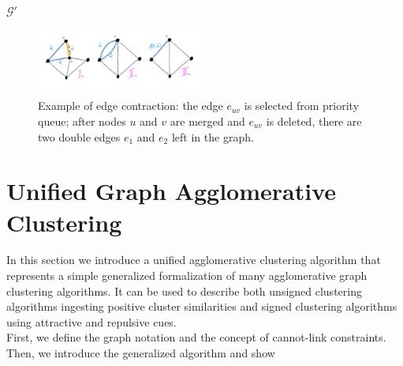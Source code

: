 \begin{algorithm}
\begin{algorithmic}[1]
      \State
      \State
      \Return $\mathcal{G}'$



  \end{algorithmic}
  \label{main_alg}
\end{algorithm}

\begin{figure}
\centering
\includegraphics[width=0.50\textwidth,trim=0.in 0.in 0.in 0.in,clip]{./figs/edge_contraction.png}
\caption{\small 
Example of edge contraction: the edge $e_{uv}$ is selected from priority queue; after nodes $u$ and $v$ are merged and $e_{uv}$ is deleted, there are two double edges $e_1$ and $e_2$ left in the graph.  
\label{fig:example_non_unique_weights_1}}
\end{figure}



\section{Unified Graph Agglomerative Clustering}
In this section we introduce a unified agglomerative clustering algorithm that represents a simple generalized formalization of many agglomerative graph clustering algorithms. It can be used to describe both unsigned clustering algorithms ingesting positive cluster similarities and signed clustering algorithms using attractive and repulsive cues.\\
First, we define the graph notation and the concept of cannot-link constraints. Then, we introduce the generalized algorithm and show 

